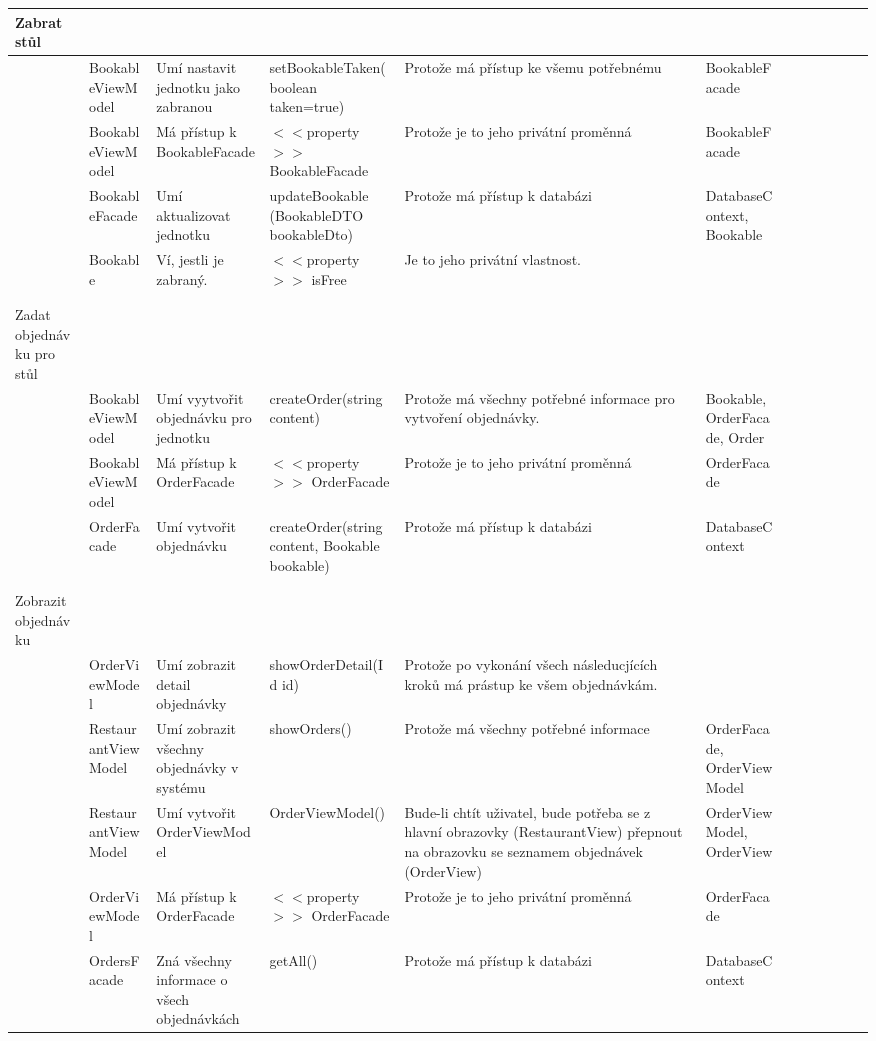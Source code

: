 \begin{landscape}
\begin{longtable}{ Lp{3cm} | Lp{3.5cm} | Lp{4.5cm} | Lp{4cm} | Lp{4.5cm} | Lp{4cm} }
    Zabrat stůl & & & & & \\
    \hline
    & BookableViewModel & Umí nastavit jednotku jako zabranou & setBookableTaken(boolean taken=true) & Protože má přístup ke všemu potřebnému & BookableFacade\\
    & BookableViewModel & Má přístup k BookableFacade & $<<$property$>>$ BookableFacade & Protože je to jeho privátní proměnná & BookableFacade \\
    & BookableFacade & Umí aktualizovat jednotku & updateBookable (BookableDTO bookableDto) & Protože má přístup k databázi & DatabaseContext, Bookable\\
    & Bookable & Ví, jestli je zabraný. & $<<$property$>>$ isFree & Je to jeho privátní vlastnost. & \\
    & & & & & \\
    & & & & & \\
    
    Zadat objednávku pro stůl & & & & & \\
    \hline
    & BookableViewModel & Umí vyytvořit objednávku pro jednotku & createOrder(string content) & Protože má všechny potřebné informace pro vytvoření objednávky. & Bookable, OrderFacade, Order \\
    & BookableViewModel & Má přístup k OrderFacade & $<<$property$>>$ OrderFacade & Protože je to jeho privátní proměnná & OrderFacade \\
    & OrderFacade & Umí vytvořit objednávku & createOrder(string content, Bookable bookable) & Protože má přístup k databázi & DatabaseContext \\
    & & & & & \\
    & & & & & \\
    
    Zobrazit objednávku & & & & & \\
    \hline
    & OrderViewModel & Umí zobrazit detail objednávky & showOrderDetail(Id id) & Protože po vykonání všech následucjících kroků má prástup ke všem objednávkám. & \\
    & RestaurantViewModel & Umí zobrazit všechny objednávky v systému & showOrders() & Protože má všechny potřebné informace & OrderFacade, OrderViewModel \\
    & RestaurantViewModel & Umí vytvořit OrderViewModel & OrderViewModel() & Bude-li chtít uživatel, bude potřeba se z hlavní obrazovky (RestaurantView) přepnout na obrazovku se seznamem objednávek (OrderView) & OrderViewModel, OrderView \\
    & OrderViewModel & Má přístup k OrderFacade & $<<$property$>>$ OrderFacade & Protože je to jeho privátní proměnná & OrderFacade \\
    & OrdersFacade & Zná všechny informace o všech objednávkách & getAll() & Protože má přístup k databázi & DatabaseContext\\
    

\end{longtable}
\end{landscape}
